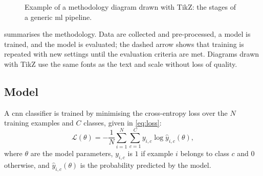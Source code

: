 \begin{figure}[htbp]
  \centering
  \caption{Example of a methodology diagram drawn with TikZ: the stages of a
    generic \acrshort{ml} pipeline.}
  \label{fig:pipeline}
\end{figure}

 summarises the methodology. Data are collected and
pre-processed, a model is trained, and the model is evaluated; the dashed
arrow shows that training is repeated with new settings until the
evaluation criteria are met. Diagrams drawn with TikZ use the same fonts as
the text and scale without loss of quality.

\subsection{Model}
\label{sec:method:model}

A \gls{cnn} classifier is trained by minimising the cross-entropy loss over
the $N$ training examples and $C$ classes, given in \cref{eq:loss}:
\begin{equation}
  \mathcal{L}(\theta) = -\frac{1}{N} \sum_{i=1}^{N} \sum_{c=1}^{C}
  y_{i,c} \log \hat{y}_{i,c}(\theta),
  \label{eq:loss}
\end{equation}
where $\theta$ are the model parameters, $y_{i,c}$ is $1$ if example $i$
belongs to class $c$ and $0$ otherwise, and $\hat{y}_{i,c}(\theta)$ is the
probability predicted by the model.

